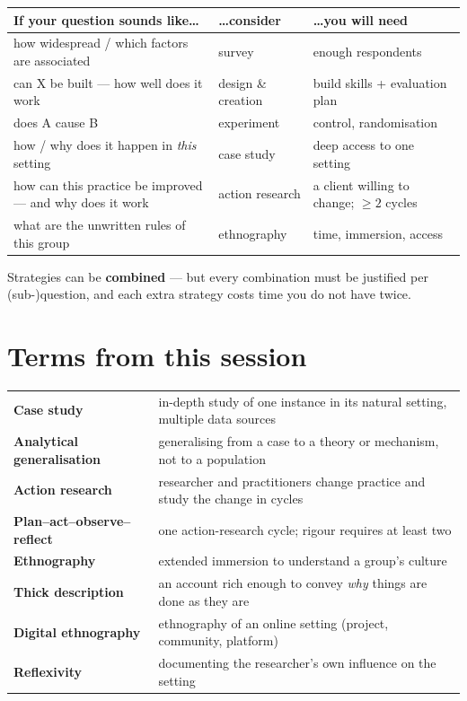 \documentclass[11pt,a4paper,british,twoside=false,headings=small,chapterprefix=false,numbers=noenddot]{scrbook}
\begin{document}
\begin{center}\small
\footnotesize
  \renewcommand{\arraystretch}{1.3}
  \begin{tabular}{@{}p{5.9cm}p{3.1cm}p{4.0cm}@{}}
    \toprule
    \textbf{If your question sounds like\dots} & \textbf{\dots consider} & \textbf{\dots you will need}\\
    \midrule
    how widespread / which factors are associated & survey & enough respondents\\
    can X be built --- how well does it work & design \& creation & build skills + evaluation plan\\
    does A cause B & experiment & control, randomisation\\
    how / why does it happen in \emph{this} setting & case study & deep access to one setting\\
    how can this practice be improved --- and why does it work & action research & a client willing to change; $\geq 2$ cycles\\
    what are the unwritten rules of this group & ethnography & time, immersion, access\\
    \bottomrule
  \end{tabular}
  

  Strategies can be \textbf{combined} --- but every combination must be
  justified per (sub-)question, and each extra strategy costs time you do
  not have twice.
\end{center}


\section*{Terms from this session}
\begin{center}\small
\footnotesize
  \renewcommand{\arraystretch}{1.2}
  \begin{tabular}{@{}p{3.8cm}p{9.7cm}@{}}
    \toprule
    \textbf{Case study} & in-depth study of one instance in its natural setting, multiple data sources\\
    \textbf{Analytical generalisation} & generalising from a case to a theory or mechanism, not to a population\\
    \textbf{Action research} & researcher and practitioners change practice and study the change in cycles\\
    \textbf{Plan--act--observe--reflect} & one action-research cycle; rigour requires at least two\\
    \textbf{Ethnography} & extended immersion to understand a group's culture\\
    \textbf{Thick description} & an account rich enough to convey \emph{why} things are done as they are\\
    \textbf{Digital ethnography} & ethnography of an online setting (project, community, platform)\\
    \textbf{Reflexivity} & documenting the researcher's own influence on the setting\\
    \bottomrule
  \end{tabular}
\end{center}
\end{document}
